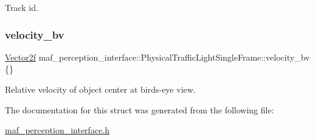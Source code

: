 Track id. 

\mbox{\label{structmaf__perception__interface_1_1PhysicalTrafficLightSingleFrame_a97cb76a8cd716bcc1e229eef66718049}} 
\subsubsection{\texorpdfstring{velocity\+\_\+bv}{velocity\_bv}}
{\footnotesize\ttfamily \hyperlink{structmaf__perception__interface_1_1Vector2f}{Vector2f} maf\+\_\+perception\+\_\+interface\+::\+Physical\+Traffic\+Light\+Single\+Frame\+::velocity\+\_\+bv \{\}}



Relative velocity of object center at bird\textquotesingle{}s-\/eye view. 



The documentation for this struct was generated from the following file\+:\begin{DoxyCompactItemize}
\item 
\hyperlink{maf__perception__interface_8h}{maf\+\_\+perception\+\_\+interface.\+h}\end{DoxyCompactItemize}
